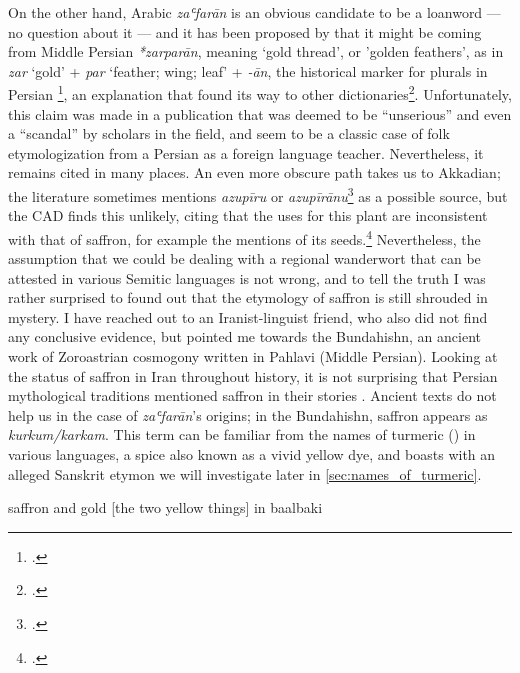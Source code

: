 On the other hand, Arabic \textit{zaʿfarān} is an obvious candidate to be a loanword --- no question about it --- and it has been proposed by \textcite{asbaghi_persische_1988} that it might be coming from Middle Persian \textit{*zarparān}, meaning `gold thread', or 'golden feathers', as in \textit{zar} `gold' + \textit{par} `feather; wing; leaf' + \textit{-ān}, the historical marker for plurals in Persian \footcite[65,98]{mackenzie_concise_1986}, an explanation that found its way to other dictionaries\footcite[cf.][safran]{ns}. Unfortunately, this claim was made in a publication that was deemed to be ``unserious'' \autocite[9]{ullmann_zur_1997} and even a ``scandal'' \autocite[315]{niehoff_review_1989} by scholars in the field, and seem to be a classic case of folk etymologization from a Persian as a foreign language teacher. Nevertheless, it remains cited in many places. An even more obscure path takes us to Akkadian; the literature sometimes mentions \textit{azupīru} or \textit{azupīrānu}\footcite[33]{black_concise_2000} as a possible source, but the \gls{CAD} finds this unlikely, citing that the uses for this plant are inconsistent with that of saffron, for example the mentions of its seeds.\footcite[531]{roth_assyrian_2004} 
Nevertheless, the assumption that we could be dealing with a regional \gls{wanderwort} that can be attested in various Semitic languages is not wrong, and to tell the truth I was rather surprised to found out that the etymology of saffron is still shrouded in mystery. I have reached out to an Iranist-linguist friend, who also did not find any conclusive evidence, but pointed me towards the Bundahishn, an ancient work of Zoroastrian cosmogony written in Pahlavi (Middle Persian). Looking at the status of saffron in Iran throughout history, it is not surprising that Persian mythological traditions mentioned saffron in their stories \autocite[cf.]{sharifi_etymology_2010, golfam_saffron_2017}. Ancient texts do not help us in the case of \textit{zaʿfarān}'s origins; in the Bundahishn, saffron appears as \textit{kurkum/karkam}. This term can be familiar from the names of turmeric () in various languages, a spice also known as a vivid yellow dye, and boasts with an alleged Sanskrit etymon we will investigate later in \cref{sec:names_of_turmeric}.

 saffron and gold [the two yellow things] in baalbaki





